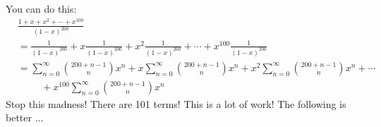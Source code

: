 
You can do this:
\begin{align*}
&\frac{1 + x + x^2 + \cdots + x^{100}}{(1 - x)^{200}}
\\
&= \frac{1}{(1 - x)^{200}} +
x\frac{1}{(1 - x)^{200}} +
x^2\frac{1}{(1 - x)^{200}} +
\cdots +
x^{100} \frac{1}{(1 - x)^{200}}
\\
&= \sum_{n=0}^\infty\binom{200 + n - 1}{n} x^n +
x\sum_{n=0}^\infty\binom{200 + n - 1}{n} x^n +
x^2\sum_{n=0}^\infty\binom{200 + n - 1}{n} x^n +
\cdots
\\
&\hspace{1cm} + x^{100}\sum_{n=0}^\infty\binom{200 + n - 1}{n} x^n
\end{align*}
Stop this madness! There are 101 terms! This is a lot of work!
The following is better ...

